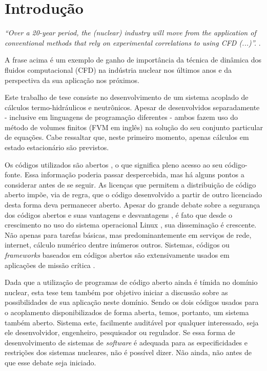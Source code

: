 \chapter{Introdução}
\label{chap:introducao}

\emph{``Over a 20-year period, the (nuclear) industry will move from 
the application of conventional methods that rely on 
experimental correlations to using CFD (...)''.} \cite[p.~655]{Baglietto2011}.

A frase acima é um exemplo de ganho de importância da técnica de dinâmica dos fluidos 
computacional (CFD) na indústria nuclear nos últimos anos e da perspectiva da sua aplicação 
nos próximos.  

Este trabalho de tese consiste no desenvolvimento de um sistema acoplado de cálculos
termo-hidráulicos e neutrônicos. Apesar de desenvolvidos separadamente - inclusive
em linguagens de programação diferentes - ambos fazem uso do método de volumes
finitos \cite{Eymard2003} (FVM em inglês) na solução do seu conjunto particular de equações.
Cabe ressaltar que, neste primeiro momento, apenas cálculos em estado estacionário
são previstos.

Os códigos utilizados são abertos \cite[Capítulo~3]{Stallman2002}, o que significa pleno acesso ao seu código-fonte.
Essa informação poderia passar despercebida, mas há alguns pontos a considerar antes de se
seguir. As licenças que permitem a distribuição de código aberto impõe, via de regra, que
o código desenvolvido a partir de outro licenciado desta forma deva permanecer aberto.
Apesar do grande debate sobre a segurança dos códigos abertos e suas vantagens e desvantagens \cite[Seção~2.6]{Androutsellis2010},
é fato que desde o crescimento no uso do sistema operacional Linux \cite{LinuxBritannica}, sua disseminação é crescente.
Não apenas para tarefas básicas, mas predominantemente em serviços de rede, internet, cálculo numérico dentre
inúmeros outros. Sistemas, códigos ou \textit{frameworks} baseados em códigos abertos são
extensivamente usados em aplicações de missão crítica \cite{Norris2004}.

Dada que a utilização de programas de código aberto ainda é tímida no domínio nuclear,
esta tese tem também por objetivo iniciar a discussão sobre as possibilidades de sua
aplicação neste domínio. Sendo os dois códigos usados para o acoplamento disponibilizados
de forma aberta, temos, portanto, um sistema também aberto. Sistema este, facilmente auditável
por qualquer interessado, seja ele desenvolvidor, engenheiro, pesquisador ou regulador.
Se essa forma de desenvolvimento de sistemas de \textit{software} é adequada para as especificidades
e restrições dos sistemas nucleares, não é possível dizer. Não ainda, não antes de que esse debate
seja iniciado.

